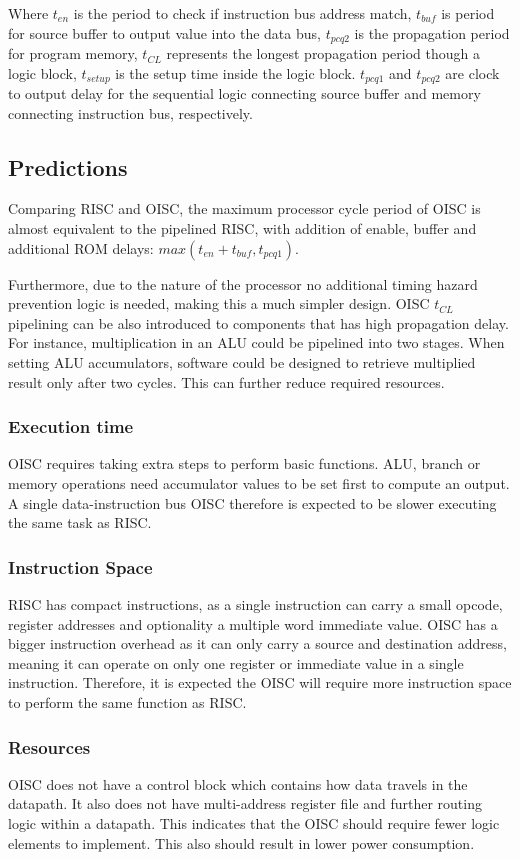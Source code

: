Where $t_{en}$ is the period to check if instruction bus address match, $t_{buf}$ is period for source buffer to output value into the data bus, $t_{pcq2}$ is the propagation period for program memory, $t_{CL}$ represents the longest propagation period though a logic block, $t_{setup}$ is the setup time inside the logic block. $t_{pcq1}$ and $t_{pcq2}$ are clock to output delay for the sequential logic connecting source buffer and memory connecting instruction bus, respectively. 

\subsection{Predictions}

Comparing RISC and OISC, the maximum processor cycle period of OISC is almost equivalent to the pipelined RISC, with addition of enable, buffer and additional ROM delays: $max \left( t_{en} + t_{buf}, t_{pcq1}\right)$.

Furthermore, due to the nature of the processor no additional timing hazard prevention logic is needed, making this a much simpler design. OISC $t_{CL}$ pipelining can be also introduced to components that has high propagation delay. For instance, multiplication in an ALU could be pipelined into two stages. When setting ALU accumulators, software could be designed to retrieve multiplied result only after two cycles. This can further reduce required resources.

\subsubsection{Execution time}
OISC requires taking extra steps to perform basic functions. ALU, branch or memory operations need accumulator values to be set first to compute an output. A single data-instruction bus OISC therefore is expected to be slower executing the same task as RISC.

\subsubsection{Instruction Space}
RISC has compact instructions, as a single instruction can carry a small opcode, register addresses and optionality a multiple word immediate value. OISC has a bigger instruction overhead as it can only carry a source and destination address, meaning it can operate on only one register or immediate value in a single instruction. Therefore, it is expected the OISC will require more instruction space to perform the same function as RISC.

\subsubsection{Resources}
OISC does not have a control block which contains how data travels in the datapath. It also does not have multi-address register file and further routing logic within a datapath. This indicates that the OISC should require fewer logic elements to implement. This also should result in lower power consumption. 
